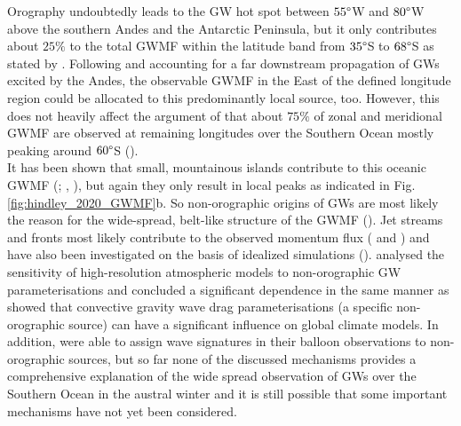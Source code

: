 Orography undoubtedly leads to the GW hot spot between $55 \degree$W and $80 \degree$W above the southern Andes and the Antarctic Peninsula, but it only contributes about $25 \%$ to the total GWMF within the latitude band from $35 \degree$S to $68 \degree$S as stated by \textcite{hindley_18year_2020}. Following \textcite{sato_gravity_2012} and accounting for a far downstream propagation of GWs excited by the Andes, the observable GWMF in the East of the defined longitude region could be allocated to this predominantly local source, too. However, this does not heavily affect the argument of \textcite{hindley_18year_2020} that about $75 \%$ of zonal and meridional GWMF are observed at remaining longitudes over the Southern Ocean mostly peaking around $60 \degree$S (\cite{hindley_18year_2020}). \\
It has been shown that small, mountainous islands contribute to this oceanic GWMF (\cite{garfinkel_effect_2018}; \cite{mclandress_is_2012}, \cite{alexander_momentum_2009}), but again they only result in local peaks as indicated in Fig. \ref{fig:hindley_2020_GWMF}b. So non-orographic origins of GWs are most likely the reason for the wide-spread, belt-like structure of the GWMF (\cite{hendricks_what_2014}). Jet streams and fronts most likely contribute to the observed momentum flux (\cite{plougonven_internal_2014} and \cite{hendricks_what_2014}) and have also been investigated on the basis of idealized simulations (\cite{osullivan_generation_1995}). \textcite{polichtchouk_sensitivity_2018} analysed the sensitivity of high-resolution atmospheric models to non-orographic GW parameterisations and concluded a significant dependence in the same manner as \textcite{choi_effects_2013} showed that convective gravity wave drag parameterisations (a specific non-orographic source) can have a significant influence on global climate models. In addition, \textcite{jewtoukoff_comparison_2015} were able to assign wave signatures in their balloon observations to non-orographic sources, but so far none of the discussed mechanisms provides a comprehensive explanation of the wide spread observation of GWs over the Southern Ocean in the austral winter and it is still possible that some important mechanisms have not yet been considered.

